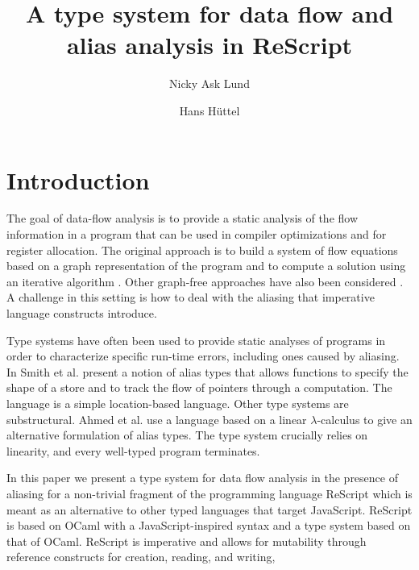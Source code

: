 \documentclass{llncs}
\begin{document}
\title{A type system for data flow and alias analysis in ReScript}

\author{Nicky Ask Lund  \and Hans Hüttel } 

\maketitle





\section{Introduction}

The goal of data-flow analysis is to provide a static analysis of the
flow information in a program that can be used in compiler
optimizations and for register allocation. The original approach is to
build a system of flow equations based on a graph representation of
the program and to compute a solution using an iterative algorithm
\cite{KildallGaryA1973Auat,RyderBarbara1988Idaa}. Other graph-free
approaches have also been considered
\cite{HorspoolR.Niegel2002AGAt}. A challenge in this setting is how to
deal with the aliasing that imperative language constructs introduce.

Type systems have often been used to provide static analyses of
programs in order to characterize specific run-time errors, including
ones caused by aliasing. In \cite{10.1007/3-540-46425-5_24} Smith et
al. present a notion of alias types that allows functions to specify
the shape of a store and to track the flow of pointers through a
computation. The language is a simple location-based language. Other
type systems are substructural. Ahmed et
al. \cite{DBLP:conf/tlca/MorrisettAF05} use a language based on a
linear $\lambda$-calculus to give an alternative formulation of alias
types. The type system crucially relies on linearity, and every
well-typed program terminates.

In this paper we present a type system for data flow analysis in the
presence of aliasing for a non-trivial fragment of the programming
language ReScript which is meant as an alternative to other typed
languages that target JavaScript. ReScript is based on OCaml with a
JavaScript-inspired syntax and a type system based on that of
OCaml\cite{rescript_rebrand}. ReScript is imperative and allows for
mutability through reference constructs for creation, reading, and
writing,
\end{document}
